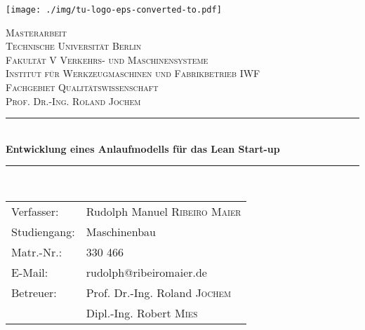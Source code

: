 \begin{titlepage}
\begin{flushright}
\texttt{[image: ./img/tu-logo-eps-converted-to.pdf]}\\[2.5cm] %
\end{flushright}

\newcommand{\HRule}{\rule{\linewidth}{0.5mm}} %

\center %
 

\textsc{\LARGE Masterarbeit}\\[1.5cm] %
\textsc{\Large Technische Universität Berlin\\Fakultät V  Verkehrs- und Maschinensysteme}\\[0.5cm] %
\textsc{\large Institut für Werkzeugmaschinen und Fabrikbetrieb IWF\\Fachgebiet Qualitätswissenschaft\\Prof. Dr.-Ing. Roland Jochem}\\[2.5cm] %


\HRule \\[0.6cm]
{ \huge \bfseries Entwicklung eines Anlaufmodells für das Lean Start-up}\\[0.4cm] %
\HRule \\[3cm]
 
\begin{tabular}{ll}
Verfasser: & Rudolph Manuel \textsc{Ribeiro Maier} \\
Studiengang: & Maschinenbau \\
Matr.-Nr.: & 330 466 \\
E-Mail: & rudolph@ribeiromaier.de \\[1cm]
Betreuer: & Prof. Dr.-Ing. Roland \textsc{Jochem} \\
& Dipl.-Ing. Robert \textsc{Mies}
\end{tabular}\\[2cm]
 

\end{titlepage}
